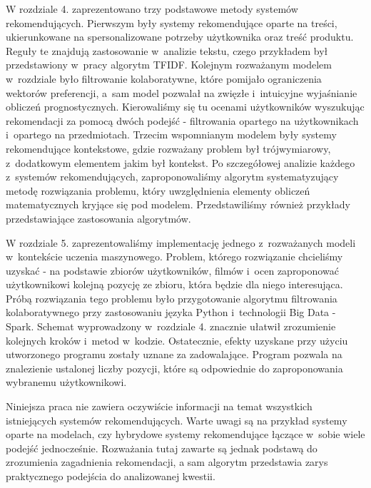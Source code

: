 \documentclass[12pt,a4paper]{report}
\begin{document}
W rozdziale 4. zaprezentowano trzy podstawowe metody systemów rekomendujących. Pierwszym były systemy rekomendujące oparte na treści, ukierunkowane na spersonalizowane potrzeby użytkownika oraz treść produktu. Reguły te znajdują zastosowanie w~analizie tekstu, czego przykładem był przedstawiony w~pracy algorytm TFIDF. Kolejnym rozważanym modelem w~rozdziale było filtrowanie kolaboratywne, które pomijało ograniczenia wektorów preferencji, a~sam model pozwalał na zwięzłe i~intuicyjne wyjaśnianie obliczeń prognostycznych. Kierowaliśmy się tu ocenami użytkowników wyszukując rekomendacji za pomocą dwóch podejść - filtrowania opartego na użytkownikach i~opartego na przedmiotach. Trzecim wspomnianym modelem były systemy rekomendujące kontekstowe, gdzie rozważany problem był trójwymiarowy, z~dodatkowym elementem jakim był kontekst. Po szczegółowej analizie każdego z~systemów rekomendujących, zaproponowaliśmy algorytm systematyzujący metodę rozwiązania problemu, który uwzględnienia elementy obliczeń matematycznych kryjące się pod modelem. Przedstawiliśmy również przykłady przedstawiające zastosowania algorytmów.

W rozdziale 5. zaprezentowaliśmy implementację jednego z~rozważanych modeli w~kontekście uczenia maszynowego. Problem, którego rozwiązanie chcieliśmy uzyskać - na podstawie zbiorów użytkowników, filmów i~ocen zaproponować użytkownikowi kolejną pozycję ze zbioru, która będzie dla niego interesująca. Próbą rozwiązania tego problemu było przygotowanie algorytmu filtrowania kolaboratywnego przy zastosowaniu języka Python i~technologii Big Data - Spark. Schemat wyprowadzony w~rozdziale 4. znacznie ułatwił zrozumienie kolejnych kroków i~metod w~kodzie. Ostatecznie, efekty uzyskane przy użyciu utworzonego programu zostały uznane za zadowalające. Program pozwala na znalezienie ustalonej liczby pozycji, które są odpowiednie do zaproponowania wybranemu użytkownikowi. 

Niniejsza praca nie zawiera oczywiście informacji na temat wszystkich istniejących systemów rekomendujących. Warte uwagi są na przykład systemy oparte na modelach, czy hybrydowe systemy rekomendujące łączące w~sobie wiele podejść jednocześnie. Rozważania tutaj zawarte są jednak podstawą do zrozumienia zagadnienia rekomendacji, a sam algorytm przedstawia zarys praktycznego podejścia do analizowanej kwestii.



\end{document}
